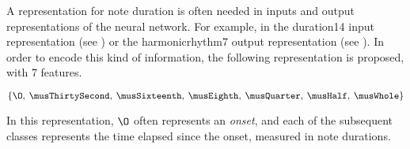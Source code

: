 
A representation for note duration is often needed in inputs
and output representations of the neural network. For
example, in the \gls{duration14} input representation (see
) or the \gls{harmonicrhythm7} output
representation (see ). In
order to encode this kind of information, the following
representation is proposed, with 7 features.

\begin{equation}
    \{\O,\: \musThirtySecond,\: \musSixteenth,\: \musEighth,\: 
    \musQuarter,\: \musHalf,\: \musWhole \}
\end{equation}

In this representation, $\O$ often represents an
\emph{onset}, and each of the subsequent classes represents
the time elapsed since the onset, measured in note
durations.
